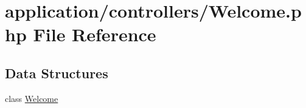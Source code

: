 \hypertarget{_welcome_8php}{}\section{application/controllers/\+Welcome.php File Reference}
\label{_welcome_8php}
\subsection*{Data Structures}
\begin{DoxyCompactItemize}
\item 
class \mbox{\hyperlink{class_welcome}{Welcome}}
\end{DoxyCompactItemize}
